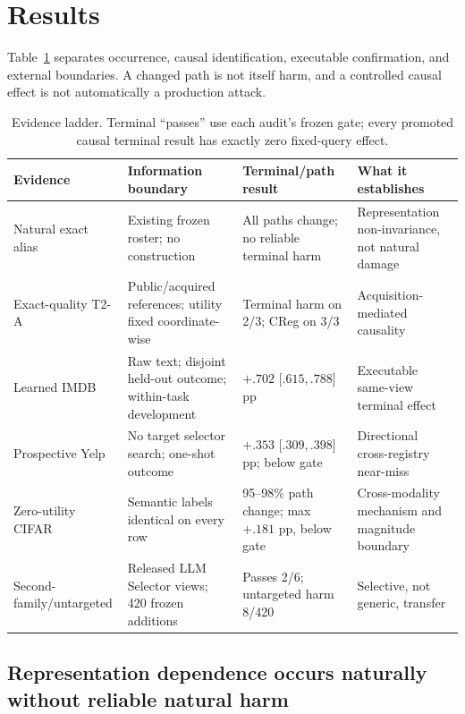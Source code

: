 \section{Results}
\label{sec:results}

Table~\ref{tab:result-ladder} separates occurrence, causal identification, executable confirmation, and external boundaries. A changed path is not itself harm, and a controlled causal effect is not automatically a production attack.

\begin{table}[H]
\centering
\caption{Evidence ladder. Terminal ``passes'' use each audit's frozen gate; every promoted causal terminal result has exactly zero fixed-query effect.}
\label{tab:result-ladder}
\scriptsize
\setlength{\tabcolsep}{3pt}
\begin{tabularx}{\linewidth}{@{}p{.17\linewidth}p{.22\linewidth}p{.25\linewidth}>{\raggedright\arraybackslash}X@{}}
\toprule
Evidence & Information boundary & Terminal/path result & What it establishes \\
\midrule
Natural exact alias & Existing frozen roster; no construction & All paths change; no reliable terminal harm & Representation non-invariance, not natural damage \\
Exact-quality T2-A & Public/acquired references; utility fixed coordinate-wise & Terminal harm on 2/3; CReg on 3/3 & Acquisition-mediated causality \\
Learned IMDB & Raw text; disjoint held-out outcome; within-task development & $+.702$ [$.615,.788$] pp & Executable same-view terminal effect \\
Prospective Yelp & No target selector search; one-shot outcome & $+.353$ [$.309,.398$] pp; below gate & Directional cross-registry near-miss \\
Zero-utility CIFAR & Semantic labels identical on every row & 95--98\% path change; max $+.181$ pp, below gate & Cross-modality mechanism and magnitude boundary \\
Second-family/untargeted & Released LLM Selector views; 420 frozen additions & Passes 2/6; untargeted harm 8/420 & Selective, not generic, transfer \\
\bottomrule
\end{tabularx}
\end{table}

\subsection{Representation dependence occurs naturally without reliable natural harm}

